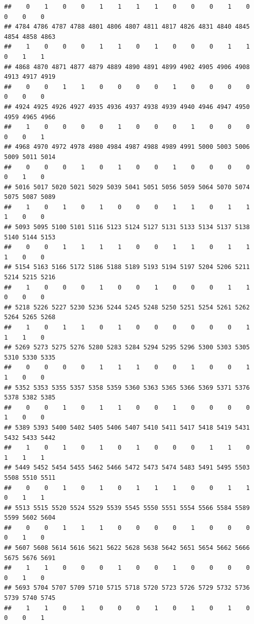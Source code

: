 \documentclass[
]{article}
\begin{document}
\begin{verbatim}
##    0    1    0    0    1    1    1    1    0    0    0    1    0    0    0    0 
## 4784 4786 4787 4788 4801 4806 4807 4811 4817 4826 4831 4840 4845 4854 4858 4863 
##    1    0    0    0    1    1    0    1    0    0    0    1    1    0    1    1 
## 4868 4870 4871 4877 4879 4889 4890 4891 4899 4902 4905 4906 4908 4913 4917 4919 
##    0    0    1    1    0    0    0    0    1    0    0    0    0    0    0    0 
## 4924 4925 4926 4927 4935 4936 4937 4938 4939 4940 4946 4947 4950 4959 4965 4966 
##    1    0    0    0    0    1    0    0    0    1    0    0    0    0    0    1 
## 4968 4970 4972 4978 4980 4984 4987 4988 4989 4991 5000 5003 5006 5009 5011 5014 
##    0    0    0    1    0    1    0    0    1    0    0    0    0    0    1    0 
## 5016 5017 5020 5021 5029 5039 5041 5051 5056 5059 5064 5070 5074 5075 5087 5089 
##    1    0    1    0    1    0    0    0    1    1    0    1    1    1    0    0 
## 5093 5095 5100 5101 5116 5123 5124 5127 5131 5133 5134 5137 5138 5140 5144 5153 
##    0    0    1    1    1    1    0    0    1    1    0    1    1    1    0    0 
## 5154 5163 5166 5172 5186 5188 5189 5193 5194 5197 5204 5206 5211 5214 5215 5216 
##    1    0    0    0    1    0    0    1    0    0    0    1    1    0    0    0 
## 5218 5226 5227 5230 5236 5244 5245 5248 5250 5251 5254 5261 5262 5264 5265 5268 
##    1    0    1    1    0    1    0    0    0    0    0    0    1    1    1    0 
## 5269 5273 5275 5276 5280 5283 5284 5294 5295 5296 5300 5303 5305 5310 5330 5335 
##    0    0    0    0    1    1    1    0    0    1    0    0    1    1    0    0 
## 5352 5353 5355 5357 5358 5359 5360 5363 5365 5366 5369 5371 5376 5378 5382 5385 
##    0    0    1    0    1    1    0    0    1    0    0    0    0    1    0    0 
## 5389 5393 5400 5402 5405 5406 5407 5410 5411 5417 5418 5419 5431 5432 5433 5442 
##    1    0    1    0    1    0    1    0    0    0    1    1    0    1    1    1 
## 5449 5452 5454 5455 5462 5466 5472 5473 5474 5483 5491 5495 5503 5508 5510 5511 
##    0    0    1    0    1    0    1    1    1    0    0    1    1    0    1    1 
## 5513 5515 5520 5524 5529 5539 5545 5550 5551 5554 5566 5584 5589 5599 5602 5604 
##    0    0    1    1    1    0    0    0    0    1    0    0    0    0    1    0 
## 5607 5608 5614 5616 5621 5622 5628 5638 5642 5651 5654 5662 5666 5675 5676 5691 
##    1    1    0    0    0    1    0    0    1    0    0    0    0    0    1    0 
## 5693 5704 5707 5709 5710 5715 5718 5720 5723 5726 5729 5732 5736 5739 5740 5745 
##    1    1    0    1    0    0    0    1    0    1    0    1    0    0    0    1 

\end{verbatim}
\end{document}
